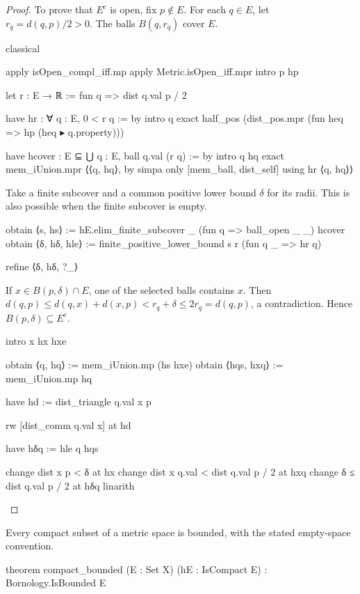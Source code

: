 \begin{proof}
  To prove that $E^{c}$ is open, fix $p\notin E$.
  For each $q\in E$, let $r_q=d(q,p)/2>0$.
  The balls $B(q,r_q)$ cover $E$.

  \begin{lean}
    classical

    apply isOpen_compl_iff.mp
    apply Metric.isOpen_iff.mpr
    intro p hp

    let r : E → ℝ := fun q => dist q.val p / 2

    have hr : ∀ q : E, 0 < r q := by
      intro q
      exact half_pos (dist_pos.mpr (fun heq => hp (heq ▸ q.property)))

    have hcover : E ⊆ ⋃ q : E, ball q.val (r q) := by
      intro q hq
      exact mem_iUnion.mpr ⟨⟨q, hq⟩, by simpa only [mem_ball, dist_self] using hr ⟨q, hq⟩⟩
  \end{lean}

  Take a finite subcover and a common positive lower bound $\delta$ for its radii.
  This is also possible when the finite subcover is empty.

  \begin{lean}
    obtain ⟨s, hs⟩ := hE.elim_finite_subcover _ (fun q => ball_open _ _) hcover
    obtain ⟨δ, hδ, hle⟩ := finite_positive_lower_bound s r (fun q _ => hr q)

    refine ⟨δ, hδ, ?_⟩
  \end{lean}

  If $x\in B(p,\delta)\cap E$, one of the selected balls contains $x$.
  Then $d(q,p)\leq d(q,x)+d(x,p)<r_q+\delta\leq 2r_q=d(q,p)$, a contradiction.
  Hence $B(p,\delta)\subseteq E^{c}$.

  \begin{lean}
    intro x hx hxe

    obtain ⟨q, hq⟩ := mem_iUnion.mp (hs hxe)
    obtain ⟨hqs, hxq⟩ := mem_iUnion.mp hq

    have hd := dist_triangle q.val x p

    rw [dist_comm q.val x] at hd

    have hδq := hle q hqs

    change dist x p < δ at hx
    change dist x q.val < dist q.val p / 2 at hxq
    change δ ≤ dist q.val p / 2 at hδq
    linarith
  \end{lean}

\end{proof}

\begin{proposition}
  \label{an1:thm:compact-set-is-bounded}
  Every compact subset of a metric space is bounded, with the stated empty-space convention.

  \begin{lean}
    theorem compact_bounded (E : Set X) (hE : IsCompact E) : Bornology.IsBounded E
  \end{lean}
\end{proposition}

